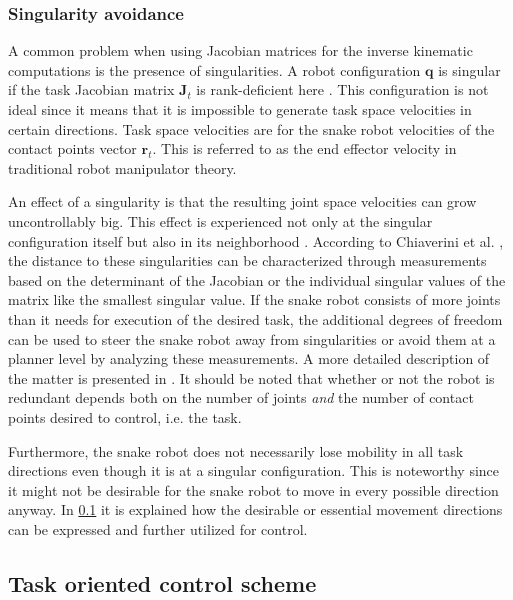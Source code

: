 \subsubsection{Singularity avoidance}

A common problem when using Jacobian matrices for the inverse kinematic computations is the presence of singularities. A robot configuration $\mathbf{q}$ is singular if the task Jacobian matrix $\mathbf{J}_t$ is rank-deficient here \cite{chiaverini2008kinematically}. This configuration is not ideal since it means that it is impossible to generate task space velocities in certain directions. Task space velocities are for the snake robot velocities of the contact points vector $\mathbf{r}_t$. This is referred to as the end effector velocity in traditional robot manipulator theory.

An effect of a singularity is that the resulting joint space velocities can grow uncontrollably big. This effect is experienced not only at the singular configuration itself but also in its neighborhood \cite{chiaverini2008kinematically}. According to Chiaverini et al. \cite{chiaverini2008kinematically}, the distance to these singularities can be characterized through measurements based on the determinant of the Jacobian or the individual singular values of the matrix like the smallest singular value. If the snake robot consists of more joints than it needs for execution of the desired task, the additional degrees of freedom can be used to steer the snake robot away from singularities or avoid them at a planner level by analyzing these measurements. A more detailed description of the matter is presented in \cite{chiaverini2008kinematically}.
It should be noted that whether or not the robot is redundant depends both on the number of joints \textit{and} the number of contact points desired to control, i.e. the task.

Furthermore, the snake robot does not necessarily lose mobility in all task directions even though it is at a singular configuration. This is noteworthy since it might not be desirable for the snake robot to move in every possible direction anyway. In \ref{subsec:task-oriented} it is explained how the desirable or essential movement directions can be expressed and further utilized for control.


\subsection{Task oriented control scheme}\label{subsec:task-oriented}


